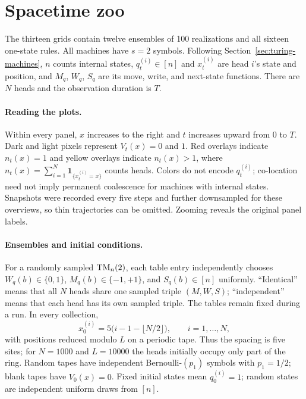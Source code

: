 \documentclass{article}
\begin{document}
\clearpage
\section{Spacetime zoo}
\label{sec:spacetime-zoo}

The thirteen grids contain twelve ensembles of 100 realizations and all
sixteen one-state rules.  All machines have $s=2$ symbols.  Following
Section~\ref{sec:turing-machines}, $n$ counts internal states,
$q_t^{(i)}\in[n]$ and $x_t^{(i)}$ are head $i$'s state and position, and
$M_q$, $W_q$, $S_q$ are its move, write, and next-state functions.
There are $N$ heads and the observation duration is $T$.

\paragraph{Reading the plots.}
Within every panel, $x$ increases to the right and $t$ increases upward
from $0$ to $T$.  Dark and light pixels represent $V_t(x)=0$ and $1$.
Red overlays indicate $n_t(x)=1$ and yellow overlays indicate $n_t(x)>1$,
where $n_t(x)=\sum_{i=1}^{N}\mathbf{1}_{\{x_t^{(i)}=x\}}$ counts heads.
Colors do not encode $q_t^{(i)}$; co-location need not imply permanent
coalescence for machines with internal states.  Snapshots were recorded
every five steps and further downsampled for these overviews, so thin
trajectories can be omitted.  Zooming reveals the original panel labels.

\paragraph{Ensembles and initial conditions.}
For a randomly sampled ${\rm TM}_n(2)$, each table entry independently
chooses $W_q(b)\in\{0,1\}$, $M_q(b)\in\{-1,+1\}$, and $S_q(b)\in[n]$
uniformly.  ``Identical'' means that all $N$ heads share one sampled
triple $(M,W,S)$; ``independent'' means that each head has its own sampled
triple.  The tables remain fixed during a run.  In every collection,
\begin{equation}
x_0^{(i)}=5\bigl(i-1-\lfloor N/2\rfloor\bigr),\qquad i=1,\ldots,N,
\end{equation}
with positions reduced modulo $L$ on a periodic tape.  Thus the spacing
is five sites; for $N=1000$ and $L=10000$ the heads initially occupy only
part of the ring.  Random tapes have independent Bernoulli-$(p_1)$ symbols
with $p_1=1/2$; blank tapes have $V_0(x)=0$.  Fixed initial states mean
$q_0^{(i)}=1$; random states are independent uniform draws from $[n]$.
\end{document}
